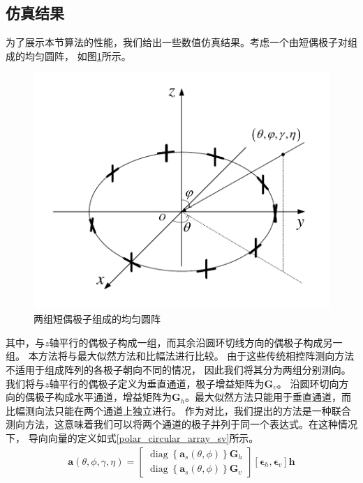 \documentclass[master]{thesis-uestc}
\begin{document}
\subsection{仿真结果}
为了展示本节算法的性能，我们给出一些数值仿真结果。考虑一个由短偶极子对组成的均匀圆阵，
如图\ref{polar_circular_array}所示。
\begin{figure}[h]
    \includegraphics[scale=0.8]{pic/circular_array.pdf}
    \caption{两组短偶极子组成的均匀圆阵}
    \label{polar_circular_array}
\end{figure}
其中，与$z$轴平行的偶极子构成一组，而其余沿圆环切线方向的偶极子构成另一组。
本方法将与最大似然方法\cite{Nickel_93}和比幅法\cite{Mosca}进行比较。
由于这些传统相控阵测向方法不适用于组成阵列的各极子朝向不同的情况，
因此我们将其分为两组分别测向。我们将与$z$轴平行的偶极子定义为垂直通道，极子增益矩阵为$\bm{G}_v$。
沿圆环切向方向的偶极子构成水平通道，增益矩阵为$\bm{G}_h$。最大似然方法只能用于垂直通道，而比幅测向法只能在两个通道上独立进行。
作为对比，我们提出的方法是一种联合测向方法，这意味着我们可以将两个通道的极子并列于同一个表达式。在这种情况下，
导向向量的定义如式\eqref{polar_circular_array_sv}所示。
\begin{equation}\label{polar_circular_array_sv}
    \begin{aligned}
        \bm{a}(\theta,\phi,\gamma,\eta) = 
        \begin{bmatrix}
            \operatorname{diag}\left\{\bm{a}_s(\theta,\phi)\right\}\bm{G}_h \\
            \operatorname{diag}\left\{\bm{a}_s(\theta,\phi)\right\}\bm{G}_v
        \end{bmatrix}
        \left[\bm{\epsilon}_h,\bm{\epsilon}_v\right]\bm{h}
    \end{aligned}
\end{equation}
\end{document}
